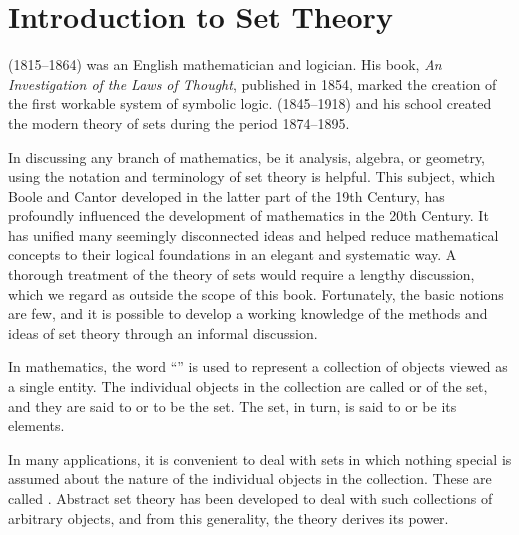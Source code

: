\section{Introduction to Set Theory}\label{sec:1.2.1}

\begin{note}
  \href{https://en.wikipedia.org/wiki/George_Boole}{} (1815--1864) was an English mathematician and logician.
  His book, \emph{An Investigation of the Laws of Thought}, published in 1854, marked the creation of the first workable system of symbolic logic.
  \href{https://en.wikipedia.org/wiki/Georg_Cantor}{} (1845--1918) and his school created the modern theory of sets during the period 1874--1895.
\end{note}

\begin{note}
  In discussing any branch of mathematics, be it analysis, algebra, or geometry, using the notation and terminology of set theory is helpful.
  This subject, which Boole and Cantor developed in the latter part of the 19th Century, has profoundly influenced the development of mathematics in the 20th Century.
  It has unified many seemingly disconnected ideas and helped reduce mathematical concepts to their logical foundations in an elegant and systematic way.
  A thorough treatment of the theory of sets would require a lengthy discussion, which we regard as outside the scope of this book.
  Fortunately, the basic notions are few, and it is possible to develop a working knowledge of the methods and ideas of set theory through an informal discussion.
\end{note}

\begin{defn}\label{defn:1.2.1}
  In mathematics, the word ``\textbf{}'' is used to represent a collection of objects viewed as a single entity.
  The individual objects in the collection are called \textbf{} or \textbf{} of the set, and they are said to \textbf{} or to be \textbf{} the set.
  The set, in turn, is said to \textbf{} or be \textbf{} its elements.
\end{defn}

\begin{note}
  In many applications, it is convenient to deal with sets in which nothing special is assumed about the nature of the individual objects in the collection.
  These are called \textbf{}.
  Abstract set theory has been developed to deal with such collections of arbitrary objects, and from this generality, the theory derives its power.
\end{note}

